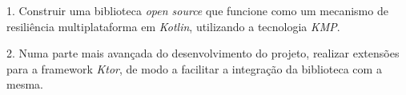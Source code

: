 1.
Construir uma biblioteca \textit{open source} que funcione como um mecanismo de resiliência multiplataforma em \textit{Kotlin}, utilizando a tecnologia \textit{KMP}.

2.
Numa parte mais avançada do desenvolvimento do projeto, realizar extensões para a framework \textit{Ktor}, de modo a facilitar a integração da biblioteca com a mesma.